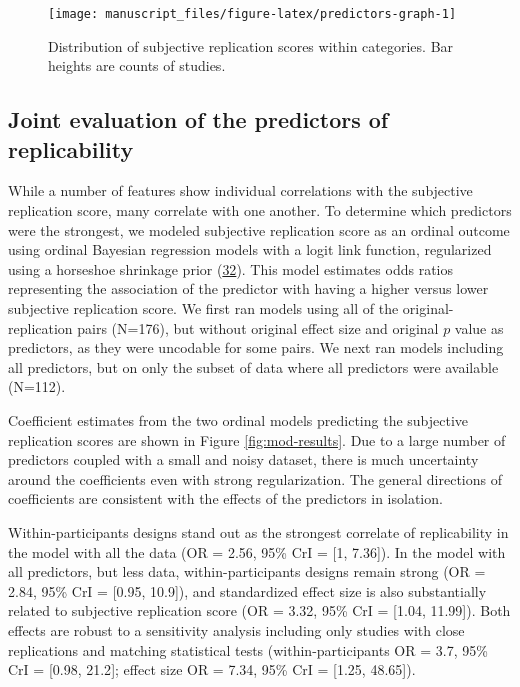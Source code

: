 \documentclass[
  english,
  a4paper,
]{article}
\begin{document}
\begin{figure}[ht]
\texttt{[image: manuscript\_files/figure-latex/predictors-graph-1]} \caption{Distribution of subjective replication scores within categories. Bar heights are counts of studies.}\label{fig:predictors-graph}
\end{figure}

\hypertarget{joint-evaluation-of-the-predictors-of-replicability}{%
\subsection{Joint evaluation of the predictors of replicability}\label{joint-evaluation-of-the-predictors-of-replicability}}

While a number of features show individual correlations with the subjective replication score, many correlate with one another. To determine which predictors were the strongest, we modeled subjective replication score as an ordinal outcome using ordinal Bayesian regression models with a logit link function, regularized using a horseshoe shrinkage prior (\protect\hyperlink{ref-carvalho09}{32}). This model estimates odds ratios representing the association of the predictor with having a higher versus lower subjective replication score. We first ran models using all of the original-replication pairs (N=176), but without original effect size and original \(p\) value as predictors, as they were uncodable for some pairs. We next ran models including all predictors, but on only the subset of data where all predictors were available (N=112).

Coefficient estimates from the two ordinal models predicting the subjective replication scores are shown in Figure \ref{fig:mod-results}. Due to a large number of predictors coupled with a small and noisy dataset, there is much uncertainty around the coefficients even with strong regularization. The general directions of coefficients are consistent with the effects of the predictors in isolation.

Within-participants designs stand out as the strongest correlate of replicability in the model with all the data (OR = 2.56, 95\% CrI = {[}1, 7.36{]}). In the model with all predictors, but less data, within-participants designs remain strong (OR = 2.84, 95\% CrI = {[}0.95, 10.9{]}), and standardized effect size is also substantially related to subjective replication score (OR = 3.32, 95\% CrI = {[}1.04, 11.99{]}). Both effects are robust to a sensitivity analysis including only studies with close replications and matching statistical tests (within-participants OR = 3.7, 95\% CrI = {[}0.98, 21.2{]}; effect size OR = 7.34, 95\% CrI = {[}1.25, 48.65{]}).
\end{document}
